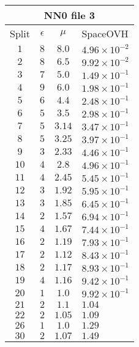 \documentclass[]{article}
\begin{document}
		
		\begin{tabular}{| c | c | c | l |}
		
		\multicolumn{4}{c}{NN0 file 3} \\
		\hline
		Split & $\epsilon$ & $\mu$ & SpaceOVH \\ \hline
		
		\hline
		$1$ & $8$ & $8.0$ & $4.96\times 10^{-2}$ \\ 
		$2$ & $8$ & $6.5$ & $9.92\times 10^{-2}$ \\ 
		$3$ & $7$ & $5.0$ & $1.49\times 10^{-1}$ \\ 
		$4$ & $9$ & $6.0$ & $1.98\times 10^{-1}$ \\ 
		$5$ & $6$ & $4.4$ & $2.48\times 10^{-1}$ \\ 
		$6$ & $5$ & $3.5$ & $2.98\times 10^{-1}$ \\ 
		$7$ & $5$ & $3.14$ & $3.47\times 10^{-1}$ \\ 
		$8$ & $5$ & $3.25$ & $3.97\times 10^{-1}$ \\ 
		$9$ & $3$ & $2.33$ & $4.46\times 10^{-1}$ \\ 
		$10$ & $4$ & $2.8$ & $4.96\times 10^{-1}$ \\ 
		$11$ & $4$ & $2.45$ & $5.45\times 10^{-1}$ \\ 
		$12$ & $3$ & $1.92$ & $5.95\times 10^{-1}$ \\ 
		$13$ & $3$ & $1.85$ & $6.45\times 10^{-1}$ \\ 
		$14$ & $2$ & $1.57$ & $6.94\times 10^{-1}$ \\ 
		$15$ & $4$ & $1.67$ & $7.44\times 10^{-1}$ \\ 
		$16$ & $2$ & $1.19$ & $7.93\times 10^{-1}$ \\ 
		$17$ & $2$ & $1.12$ & $8.43\times 10^{-1}$ \\ 
		$18$ & $2$ & $1.17$ & $8.93\times 10^{-1}$ \\ 
		$19$ & $4$ & $1.16$ & $9.42\times 10^{-1}$ \\ 
		$20$ & $1$ & $1.0$ & $9.92\times 10^{-1}$ \\ 
		$21$ & $2$ & $1.1$ & $1.04$ \\ 
		$22$ & $2$ & $1.05$ & $1.09$ \\ 
		$26$ & $1$ & $1.0$ & $1.29$ \\ 
		$30$ & $2$ & $1.07$ & $1.49$ \\ 
		 
		
		\hline  
		
		\end{tabular}
	
\end{document}
